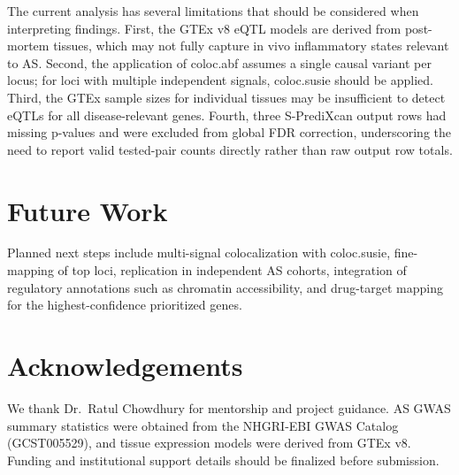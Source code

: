 \documentclass[12pt,a4paper]{article}
\begin{document}
The current analysis has several limitations that should be considered when
interpreting findings.
First, the GTEx v8 eQTL models are derived from post-mortem tissues, which
may not fully capture in vivo inflammatory states relevant to AS.
Second, the application of coloc.abf assumes a single causal variant per locus;
for loci with multiple independent signals, coloc.susie should be applied.
Third, the GTEx sample sizes for individual tissues may be insufficient to
detect eQTLs for all disease-relevant genes.
Fourth, three S-PrediXcan output rows had missing p-values and were excluded
from global FDR correction, underscoring the need to report valid tested-pair
counts directly rather than raw output row totals.

\section{Future Work}

Planned next steps include multi-signal colocalization with coloc.susie,
fine-mapping of top loci, replication in independent AS cohorts,
integration of regulatory annotations such as chromatin accessibility, and
drug-target mapping for the highest-confidence prioritized genes.

\section*{Acknowledgements}

We thank Dr.\ Ratul Chowdhury for mentorship and project guidance. AS GWAS
summary statistics were obtained from the NHGRI-EBI GWAS Catalog
(GCST005529), and tissue expression models were derived from GTEx v8.
Funding and institutional support details should be finalized before
submission.



\end{document}
